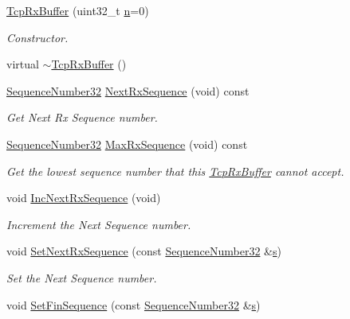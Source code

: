 \begin{DoxyCompactItemize}
\item 
\hyperlink{classns3_1_1TcpRxBuffer_ab6270bb83cc9464c2449597927da47c7}{Tcp\+Rx\+Buffer} (uint32\+\_\+t \hyperlink{lte__link__budget__x2__handover__measures_8m_abdb05bc5a064cf642a06c83b3392f148}{n}=0)
\begin{DoxyCompactList}\small\item\em Constructor. \end{DoxyCompactList}\item 
virtual \hyperlink{classns3_1_1TcpRxBuffer_a5ad973f8754413579704c8862eb4db5f}{$\sim$\+Tcp\+Rx\+Buffer} ()
\item 
\hyperlink{group__network_gacb2070e4e98d2d5135c9bede58f07a03}{Sequence\+Number32} \hyperlink{classns3_1_1TcpRxBuffer_ae994bf90329d10f17b59d32907b04ca9}{Next\+Rx\+Sequence} (void) const 
\begin{DoxyCompactList}\small\item\em Get Next Rx Sequence number. \end{DoxyCompactList}\item 
\hyperlink{group__network_gacb2070e4e98d2d5135c9bede58f07a03}{Sequence\+Number32} \hyperlink{classns3_1_1TcpRxBuffer_aa3c228adbcfac38756f78490eab605d5}{Max\+Rx\+Sequence} (void) const 
\begin{DoxyCompactList}\small\item\em Get the lowest sequence number that this \hyperlink{classns3_1_1TcpRxBuffer}{Tcp\+Rx\+Buffer} cannot accept. \end{DoxyCompactList}\item 
void \hyperlink{classns3_1_1TcpRxBuffer_aec0ff49f5d3f1b2d47dd9a9c004bda2c}{Inc\+Next\+Rx\+Sequence} (void)
\begin{DoxyCompactList}\small\item\em Increment the Next Sequence number. \end{DoxyCompactList}\item 
void \hyperlink{classns3_1_1TcpRxBuffer_a6bba147c19d638ec455b208ccbcaafb4}{Set\+Next\+Rx\+Sequence} (const \hyperlink{group__network_gacb2070e4e98d2d5135c9bede58f07a03}{Sequence\+Number32} \&\hyperlink{generate__test__data__lte__sinr_8m_ad83eeb3a142285d1243a08c6b7026df8}{s})
\begin{DoxyCompactList}\small\item\em Set the Next Sequence number. \end{DoxyCompactList}\item 
void \hyperlink{classns3_1_1TcpRxBuffer_a37b57ebcf0d9f922439f4f872b198086}{Set\+Fin\+Sequence} (const \hyperlink{group__network_gacb2070e4e98d2d5135c9bede58f07a03}{Sequence\+Number32} \&\hyperlink{generate__test__data__lte__sinr_8m_ad83eeb3a142285d1243a08c6b7026df8}{s})

\end{DoxyCompactItemize}
